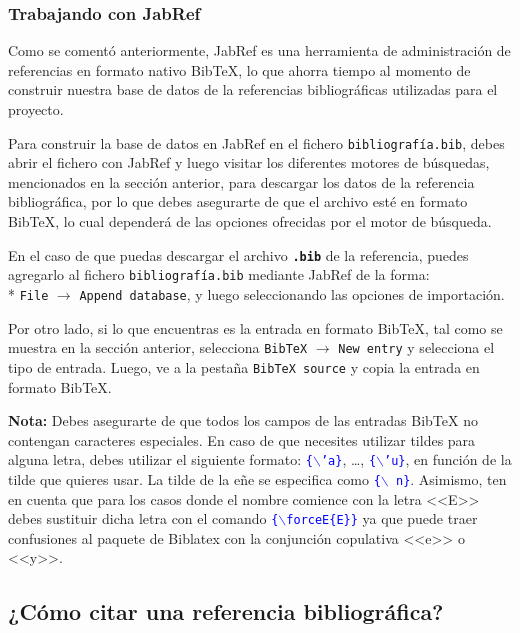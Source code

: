 \subsubsection{Trabajando con JabRef}

Como se comentó anteriormente, JabRef es una herramienta de administración de referencias en formato nativo BibTeX, lo que ahorra tiempo al momento de construir nuestra base de datos de la referencias bibliográficas utilizadas para el proyecto. 

Para construir la base de datos en JabRef en el fichero \texttt{bibliografía.bib}, debes abrir el fichero con JabRef y luego visitar los diferentes motores de búsquedas, mencionados en la    
sección anterior, para descargar los datos de la referencia bibliográfica, por lo que debes asegurarte de que el archivo esté en formato BibTeX, lo cual dependerá de las opciones ofrecidas por el motor de búsqueda. 

En el caso de que puedas descargar el archivo \texttt{\textbf{.bib}} de la referencia, puedes agregarlo al fichero \texttt{bibliografía.bib} mediante JabRef de la forma: \\*
\texttt{File}  $\rightarrow$  \texttt{Append database}, y luego seleccionando las opciones de importación. 

Por otro lado, si lo que encuentras es la entrada en formato BibTeX, tal como se muestra en la sección anterior, selecciona \texttt{BibTeX} $\rightarrow$ \texttt{New entry} y selecciona el tipo de entrada. Luego, ve a la pestaña \texttt{BibTeX source} y copia la entrada en formato BibTeX.

\noindent \textbf{Nota:} Debes asegurarte de que todos los campos de las entradas BibTeX no contengan caracteres especiales. En caso de que necesites utilizar tildes para alguna letra, debes utilizar el siguiente formato: \textcolor{blue}{\texttt{\{$\backslash$'a\}}}, \dots, \textcolor{blue}{\texttt{\{$\backslash$'u\}}}, en función de la tilde que quieres usar. La tilde de la eñe se especifica como \textcolor{blue}{\texttt{\{$\backslash$~n\}}}. Asimismo, ten en cuenta que para los casos donde el nombre comience con la letra <<E>> debes sustituir dicha letra con el comando  \textcolor{blue}{\texttt{\{$\backslash${forceE\{E\}\}}}} ya que puede traer confusiones al paquete de Biblatex con la conjunción copulativa <<e>> o <<y>>. 

\subsection{¿Cómo citar una referencia bibliográfica?}
\label{sec:cita}

